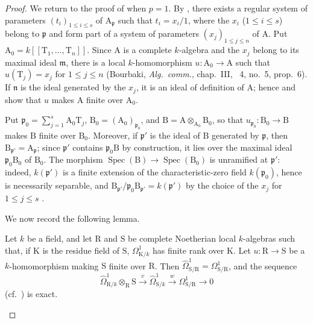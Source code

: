 \begin{proof}
We return to the proof of  when $p=1$. By , there exists a regular system of parameters $(t_i)_{1\leq i\leq s}$ of $\mathrm{A}_{\mathfrak{p}}$ such that $t_i=x_i/1$, where the $x_i$ ($1\leq i\leq s$) belong to $\mathfrak{p}$ and form part of a system of parameters $(x_j)_{1\leq j\leq n}$ of $\mathrm{A}$. Put $\mathrm{A}_0=k[[\mathrm{T}_1,\ldots,\mathrm{T}_n]]$. Since $\mathrm{A}$ is a complete $k$-algebra and the $x_j$ belong to its maximal ideal $\mathfrak{m}$, there is a local $k$-homomorphism $u:\mathrm{A}_0\to\mathrm{A}$ such that $u(\mathrm{T}_j)=x_j$ for $1\leq j\leq n$ (Bourbaki, \emph{Alg.\ comm.}, chap.~III, \textsection~4, no.~5, prop.~6). If $\mathfrak{n}$ is the ideal generated by the $x_j$, it is an ideal of definition of $\mathrm{A}$; hence  and  show that $u$ makes $\mathrm{A}$ finite over $\mathrm{A}_0$.

Put $\mathfrak{p}_0=\sum_{j=1}^{s}\mathrm{A}_0\mathrm{T}_j$, $\mathrm{B}_0=(\mathrm{A}_0)_{\mathfrak{p}_0}$, and $\mathrm{B}=\mathrm{A}\otimes_{\mathrm{A}_0}\mathrm{B}_0$, so that $u_{\mathfrak{p}_0}:\mathrm{B}_0\to\mathrm{B}$ makes
$\mathrm{B}$ finite over $\mathrm{B}_0$. Moreover, if $\mathfrak{p}'$ is the ideal of $\mathrm{B}$ generated by $\mathfrak{p}$, then $\mathrm{B}_{\mathfrak{p}'}=\mathrm{A}_{\mathfrak{p}}$; since $\mathfrak{p}'$ contains $\mathfrak{p}_0\mathrm{B}$ by construction, it lies over the maximal ideal $\mathfrak{p}_0\mathrm{B}_0$ of $\mathrm{B}_0$. The morphism $\operatorname{Spec}(\mathrm{B})\to\operatorname{Spec}(\mathrm{B}_0)$ is unramified at $\mathfrak{p}'$: indeed, $k(\mathfrak{p}')$ is a finite extension of the characteristic-zero field $k(\mathfrak{p}_0)$, hence is necessarily separable, and $\mathrm{B}_{\mathfrak{p}'}/\mathfrak{p}_0\mathrm{B}_{\mathfrak{p}'}=k(\mathfrak{p}')$ by the choice of the $x_j$ for $1\leq j\leq s$ .

We now record the following lemma.

\begin{lemma}[18.11.3.5]
\label{IV.18.11.3.5}
Let $k$ be a field, and let $\mathrm{R}$ and $\mathrm{S}$ be complete Noetherian local $k$-algebras such that, if $\mathrm{K}$ is the residue field of $\mathrm{S}$, $\Omega^1_{\mathrm{K}/k}$ has finite rank over $\mathrm{K}$. Let $u:\mathrm{R}\to\mathrm{S}$ be a $k$-homomorphism making $\mathrm{S}$ finite over $\mathrm{R}$. Then $\hat{\Omega}^1_{\mathrm{S}/\mathrm{R}}=\Omega^1_{\mathrm{S}/\mathrm{R}}$, and the sequence
\begin{equation}
\label{IV.18.11.3.6}
\tag{18.11.3.6}
  \hat{\Omega}^1_{\mathrm{R}/k}\otimes_{\mathrm{R}}\mathrm{S}\xrightarrow{v}\hat{\Omega}^1_{\mathrm{S}/k}\xrightarrow{w}\Omega^1_{\mathrm{S}/\mathrm{R}}\to 0
\end{equation}
(cf.\ ) is exact.
\end{lemma}


\end{proof}
